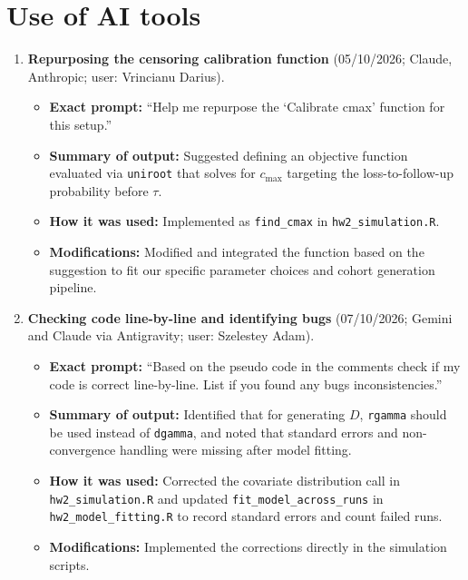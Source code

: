 \documentclass[10pt,a4paper]{article}
\begin{document}
\section*{Use of AI tools}
\begin{enumerate}[leftmargin=1.4em,itemsep=3pt]
\item \textbf{Repurposing the censoring calibration function} (05/10/2026; Claude, Anthropic; user: Vrincianu Darius).
\begin{itemize}[leftmargin=1.2em,itemsep=1pt]
\item \textbf{Exact prompt:} ``Help me repurpose the `Calibrate cmax' function for this setup.''
\item \textbf{Summary of output:} Suggested defining an objective function evaluated via \texttt{uniroot} that solves for $c_{\max}$ targeting the loss-to-follow-up probability before $\tau$.
\item \textbf{How it was used:} Implemented as \texttt{find\_cmax} in \texttt{hw2\_simulation.R}.
\item \textbf{Modifications:} Modified and integrated the function based on the suggestion to fit our specific parameter choices and cohort generation pipeline.
\end{itemize}

\item \textbf{Checking code line-by-line and identifying bugs} (07/10/2026; Gemini and Claude via Antigravity; user: Szelestey Adam).
\begin{itemize}[leftmargin=1.2em,itemsep=1pt]
\item \textbf{Exact prompt:} ``Based on the pseudo code in the comments check if my code is correct line-by-line. List if you found any bugs inconsistencies.''
\item \textbf{Summary of output:} Identified that for generating $D$, \texttt{rgamma} should be used instead of \texttt{dgamma}, and noted that standard errors and non-convergence handling were missing after model fitting.
\item \textbf{How it was used:} Corrected the covariate distribution call in \texttt{hw2\_simulation.R} and updated \texttt{fit\_model\_across\_runs} in \texttt{hw2\_model\_fitting.R} to record standard errors and count failed runs.
\item \textbf{Modifications:} Implemented the corrections directly in the simulation scripts.
\end{itemize}


\end{enumerate}
\end{document}
